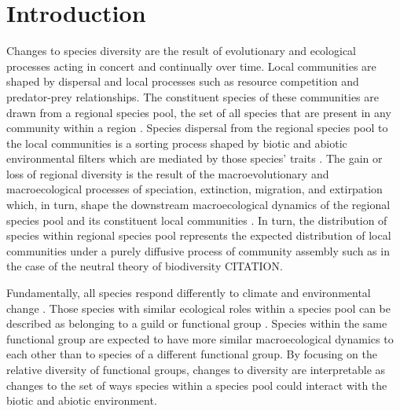 \documentclass[12pt,letterpaper]{article}
\begin{document}
\section*{Introduction}
Changes to species diversity are the result of evolutionary and ecological processes acting in concert and continually over time. Local communities are shaped by dispersal and local processes such as resource competition and predator-prey relationships. The constituent species of these communities are drawn from a regional species pool, the set of all species that are present in any community within a region \citep{Mittelbach2015a,Urban2008,Harrison2008}. Species dispersal from the regional species pool to the local communities is a sorting process shaped by biotic and abiotic environmental filters which are mediated by those species' traits \citep{Shipley2006,Elith2009,Urban2008,Loeuille2008,Cottenie2005,Harrison2008}. The gain or loss of regional diversity is the result of the macroevolutionary and macroecological processes of speciation, extinction, migration, and extirpation which, in turn, shape the downstream macroecological dynamics of the regional species pool and its constituent local communities \citep{Urban2008,Mittelbach2015a,Harrison2008}. In turn, the distribution of species within regional species pool represents the expected distribution of local communities under a purely diffusive process of community assembly such as in the case of the neutral theory of biodiversity CITATION.

Fundamentally, all species respond differently to climate and environmental change \citep{Blois2009}. Those species with similar ecological roles within a species pool can be described as belonging to a guild or functional group \citep{Valentine1969,Bambach1977,Brown1989,Simberloff1991a,Wilson1999}. Species within the same functional group are expected to have more similar macroecological dynamics to each other than to species of a different functional group. By focusing on the relative diversity of functional groups, changes to diversity are interpretable as changes to the set of ways species within a species pool could interact with the biotic and abiotic environment. 
\end{document}
